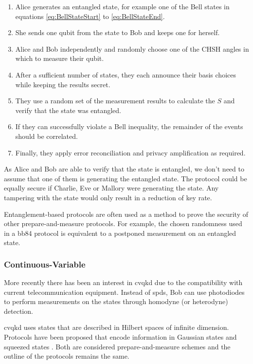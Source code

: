 \begin{algorithm}[Ekert 1991]
\begin{enumerate}
	\item Alice generates an entangled state, for example one of the Bell states in equations \ref{eq:BellStateStart} to \ref{eq:BellStateEnd}.
	\item She sends one qubit from the state to Bob and keeps one for herself.
	\item Alice and Bob independently and randomly choose one of the CHSH angles \cite{CHSH} in which to measure their qubit.
	\item After a sufficient number of states, they each announce their basis choices while keeping the results secret.
	\item They use a random set of the measurement results to calculate the $S$ and verify that the state was entangled.
	\item If they can successfully violate a Bell inequality, the remainder of the events should be correlated.
	\item Finally, they apply error reconciliation and privacy amplification as required.
\end{enumerate}
\end{algorithm}

As Alice and Bob are able to verify that the state is entangled, we don't need to assume that one of them is generating the entangled state. The protocol could be equally secure if Charlie, Eve or Mallory were generating the state. Any tampering with the state would only result in a reduction of key rate.

Entanglement-based protocols are often used as a method to prove the security of other prepare-and-measure protocols. For example, the chosen randomness used in a \ac{bb84} protocol is equivalent to a postponed measurement on an entangled state.

\subsubsection{Continuous-Variable}

More recently there has been an interest in \ac{cvqkd} due to the compatibility with current telecommunication equipment. Instead of \acp{spd}, Bob can use photodiodes to perform measurements on the states through homodyne (or heterodyne) detection. 

\Ac{cvqkd} uses states that are described in Hilbert spaces of infinite dimension. Protocols have been proposed that encode information in Gaussian states \cite{Ralph1999} and squeezed states \cite{Hillery2000Quantum}. Both are considered prepare-and-measure schemes and the outline of the protocols remains the same.

